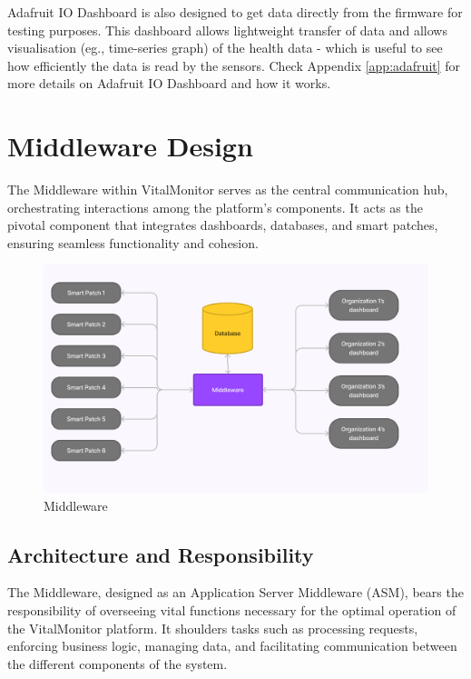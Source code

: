 \noindent Adafruit IO Dashboard is also designed to get data directly from the firmware for testing purposes. This dashboard allows lightweight transfer of data and allows visualisation (eg., time-series graph) of the health data - which is useful to see how efficiently the data is read by the sensors.  Check Appendix \ref{app:adafruit} for more details on Adafruit IO Dashboard and how it works.


\newpage
\section{Middleware Design}

The Middleware within VitalMonitor serves as the central communication hub, orchestrating interactions among the platform's components. It acts as the pivotal component that integrates dashboards, databases, and smart patches, ensuring seamless functionality and cohesion.

\begin{figure}[!h]
    \centering
    \includegraphics[width=1\linewidth]{images/compressed-data-flow.png}
    \caption{Middleware}
    \label{fig:dfd-3}
\end{figure}

\subsection{Architecture and Responsibility}
The Middleware, designed as an Application Server Middleware (ASM), bears the responsibility of overseeing vital functions necessary for the optimal operation of the VitalMonitor platform. It shoulders tasks such as processing requests, enforcing business logic, managing data, and facilitating communication between the different components of the system.\\

